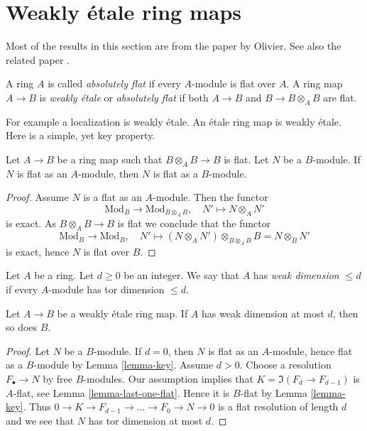 \section{Weakly \'etale ring maps}
\label{section-weakly-etale}

\noindent
Most of the results in this section are from the paper
\cite{Olivier-AF} by Olivier. See also the related paper
\cite{Ferrand-epi}.

\begin{definition}
\label{definition-weakly-etale}
A ring $A$ is called {\it absolutely flat} if every $A$-module is flat over
$A$. A ring map $A \to B$ is {\it weakly \'etale} or {\it absolutely flat}
if both $A \to B$ and $B \to B \otimes_A B$ are flat.
\end{definition}

\noindent
For example a localization is weakly \'etale. An \'etale ring map is weakly
\'etale. Here is a simple, yet key property.

\begin{lemma}
\label{lemma-key}
Let $A \to B$ be a ring map such that $B \otimes_A B \to B$ is flat.
Let $N$ be a $B$-module. If $N$ is flat as an $A$-module, then
$N$ is flat as a $B$-module.
\end{lemma}

\begin{proof}
Assume $N$ is a flat as an $A$-module.
Then the functor
$$
\text{Mod}_B \longrightarrow \text{Mod}_{B \otimes_A B},\quad
N' \mapsto N \otimes_A N'
$$
is exact. As $B \otimes_A B \to B$ is flat we conclude that the functor
$$
\text{Mod}_B \longrightarrow \text{Mod}_B,\quad
N' \mapsto (N \otimes_A N') \otimes_{B \otimes_A B} B = N \otimes_B N'
$$
is exact, hence $N$ is flat over $B$.
\end{proof}

\begin{definition}
\label{definition-weak-dimension}
Let $A$ be a ring. Let $d \geq 0$ be an integer.
We say that $A$ has {\it weak dimension $\leq d$}
if every $A$-module has tor dimension $\leq d$.
\end{definition}

\begin{lemma}
\label{lemma-weak-dimension-goes-up}
Let $A \to B$ be a weakly \'etale ring map.
If $A$ has weak dimension at most $d$, then so does $B$.
\end{lemma}

\begin{proof}
Let $N$ be a $B$-module. If $d = 0$, then $N$ is flat as an $A$-module,
hence flat as a $B$-module by Lemma \ref{lemma-key}.
Assume $d > 0$. Choose a resolution $F_\bullet \to N$
by free $B$-modules. Our assumption implies that
$K = \Im(F_d \to F_{d - 1})$ is $A$-flat, see
Lemma \ref{lemma-last-one-flat}. Hence it is $B$-flat
by Lemma \ref{lemma-key}. Thus
$0 \to K \to F_{d - 1} \to \ldots \to F_0 \to N \to 0$
is a flat resolution of length $d$ and we see that $N$ has
tor dimension at most $d$.
\end{proof}

